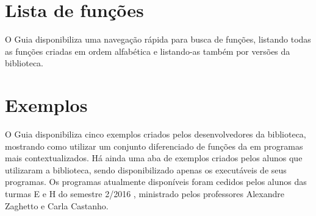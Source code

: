 \section{Lista de funções}

O Guia disponibiliza uma navegação rápida para busca de funções, listando todas as funções criadas em ordem alfabética e listando-as também por versões da biblioteca.

\section{Exemplos}
O Guia disponibiliza cinco exemplos criados pelos desenvolvedores da biblioteca, mostrando como utilizar um conjunto diferenciado de funções da \playAPC{} em programas mais contextualizados.
Há ainda uma aba de exemplos criados pelos alunos que utilizaram a biblioteca, sendo disponibilizado apenas os executáveis de seus programas. Os programas atualmente disponíveis foram cedidos pelos alunos das turmas E e H do semestre 2/2016 ,  ministrado pelos professores Alexandre Zaghetto e Carla Castanho.
